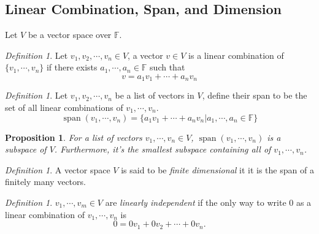 \documentclass[12pt]{amsart}
\newcommand{\fff}[0]{\mathbb{F}}
\DeclareMathOperator{\s}{span}
\newtheorem{proposition}[theorem]{Proposition}
\theoremstyle{remark}
\newtheorem{definition}[theorem]{Definition}
\numberwithin{equation}{section}
\begin{document}
\subsection{Linear Combination, Span, and Dimension}
Let $V$ be a vector space over $\fff$.
\begin{definition}
	Let $v_1,v_2,\cdots,v_n\in V $, a vector $v\in V$ is a linear combination of $\{v_1,\cdots,v_n\}$ if there exists $a_1,\cdots,a_n\in\fff$ such that 
	\[v=a_1v_1+\cdots+a_nv_n\]
\end{definition}
\begin{definition}\label{def:lin_comb}
	Let $v_1,v_2,\cdots,v_n$ be a list of vectors in $V$, define their span to be the set of all linear combinations of $v_1,\cdots, v_n$.
	\[ \s(v_1,\cdots,v_n)=\{a_1 v_1+\cdots+a_nv_n|a_1,\cdots,a_n\in\fff \}\]
\end{definition}
\begin{proposition}
	For a list of vectors $v_1,\cdots,v_n\in V$, $\s(v_1,\cdots,v_n)$ is a subspace of $V$. Furthermore, it's the smallest subspace containing all of $v_1,\cdots,v_n$.
\end{proposition}
\begin{definition}
	A vector space $V$ is said to be \emph{finite dimensional} it it is the span of a finitely many vectors.
\end{definition}

\begin{definition}\label{def:linear_ind}
	$v_1,\cdots,v_m\in V$ are \emph{linearly independent} if the only way to write $0$ as a linear combination of $v_1,\cdots,v_n$ is
	\[0=0v_1+0v_2+\cdots+0v_n.\]
\end{definition}
\end{document}
